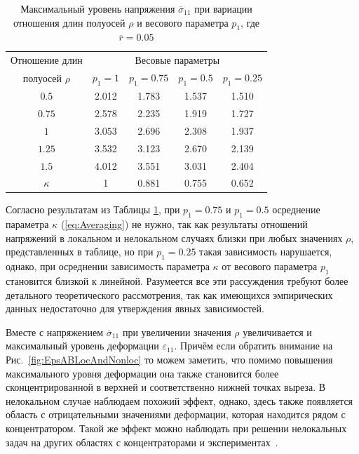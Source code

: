 \begin{table}[htbp]
    \centering
    \begin{threeparttable}%
        \caption{Максимальный уровень напряжения $\overline{\sigma}_{11}$ при вариации отношения длин полуосей $\rho$ и весового параметра $p_1$, где $\overline{r} = 0.05$}\label{tab:MaxStress}%
        \begin{tabular}{|c|c|c|c|c|}
	        \hline
			Отношение длин    & \multicolumn{4}{c|}{Весовые параметры} \\
			\cline{2-5}
			полуосей $\rho$   & $p_1 = 1$ & $p_1 = 0.75$ & $p_1 = 0.5$ & $p_1 = 0.25$ \\
			\hline
			$0.5$             & 2.012     & 1.783        & 1.537       & 1.510 \\
			\hline
			$0.75$            & 2.578     & 2.235        & 1.919       & 1.727 \\
			\hline
			$1$               & 3.053     & 2.696        & 2.308       & 1.937 \\
			\hline
			$1.25$            & 3.532     & 3.123        & 2.670       & 2.139 \\
			\hline
			$1.5$             & 4.012     & 3.551        & 3.031       & 2.404 \\
			\hline
			$\kappa$          & 1         & 0.881        & 0.755       & 0.652 \\
			\hline
        \end{tabular}
    \end{threeparttable}
\end{table}

Согласно результатам из Таблицы \ref{tab:MaxStress}, при $p_1 = 0.75$ и $p_1 = 0.5$ осреднение параметра $\kappa$ (\ref{eq:Averaging}) не нужно, так как результаты отношений напряжений в локальном и нелокальном случаях близки при любых значениях $\rho$, представленных в таблице, но при $p_1 = 0.25$ такая зависимость нарушается, однако, при осреднении зависимость параметра $\kappa$ от весового параметра $p_1$ становится близкой к линейной. Разумеется все эти рассуждения требуют более детального теоретического рассмотрения, так как имеющихся эмпирических данных недостаточно для утверждения явных зависимостей.

Вместе с напряжением $\overline{\sigma}_{11}$ при увеличении значения $\rho$ увеличивается и максимальный уровень деформации $\varepsilon_{11}$. Причём если обратить внимание на Рис.~\ref{fig:EpsABLocAndNonloc} то можем заметить, что помимо повышения максимального уровня деформации она также становится более сконцентрированной в верхней и соответственно нижней точках выреза. В нелокальном случае наблюдаем похожий эффект, однако, здесь также появляется область с отрицательными значениями деформации, которая находится рядом с концентратором. Такой же эффект можно наблюдать при решении нелокальных задач на других областях с концентраторами \cite{ZAMM} и \mbox{экспериментах \cite{Andreev}.}

